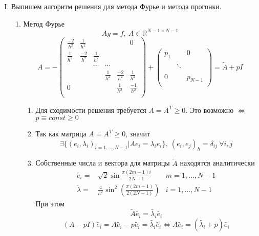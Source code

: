 \documentclass[12pt]{article}
\begin{document}
\begin{enumerate}[I.]
        \item Выпишем алгоритм решения для метода Фурье и метода прогонки.
        \begin{enumerate}
            \item Метод Фурье
            \[Ay=f,\ A\in \mathbb{R}^{N-1\times N-1}\]
            \[A=
            -\left(\begin{array}{cccccc}
                \frac{-2}{h^2}& \frac{1}{h^2}  &&&& 0 \\
                \frac{1}{h^2} & \frac{-2}{h^2} & \frac{1}{h^2} &&& \\
                &&\cdots&\cdots&& \\
                &&& \frac{1}{h^2} & \frac{-2}{h^2} & \frac{1}{h^2} \\
                0 &&&               & \frac{1}{h^2}  & \frac{-1}{h^2} \\
            \end{array}\right)
            +
            \left(\begin{array}{ccc}
                p_1  && 0 \\
                && \\
                &\ddots& \\
                && \\
                0 && p_{N-1} \\
            \end{array}\right)
            =\tilde{A} +pI\]
            \begin{enumerate}
                \item Для сходимости решения требуется $A=A^T\geq0$. Это возможно $\Leftrightarrow$ $p\equiv const\geq0$
                \item Так как матрица $A=A^T\geq0$, значит 
                \[\exists\{(e_i,\lambda_i)_{i=1,\ldots,N-1}|Ae_i=\lambda_ie_i\},\ (e_i,e_j)_h=\delta_{ij}\ \forall i,j \]
                \item Собственные числа и вектора для матрицы $\tilde{A}$ находятся аналитически
                \begin{align*}
                    \tilde{e_i}=&\sqrt{2}\sin\frac{\pi(2m-1)i}{2N-1}  &m=1,\ldots,N-1\\
                    \tilde{\lambda}=&\frac{4}{h^2}\sin^2\left(\frac{\pi(2m-1)}{2(2N-1)}\right) &i=1,\ldots,N-1
                \end{align*}
                При этом
                \[\tilde{A}\tilde{e_i}=\tilde{\lambda_i}\tilde{e_i}\]
                \[(A-pI)\tilde{e_i}=A\tilde{e_i}-p\tilde{e_i}=\tilde{\lambda_i}\tilde{e_i}\Leftrightarrow A\tilde{e_i}=(\tilde{\lambda_i}+p)\tilde{e_i}\]

\end{enumerate}
\end{enumerate}
\end{enumerate}
\end{document}
